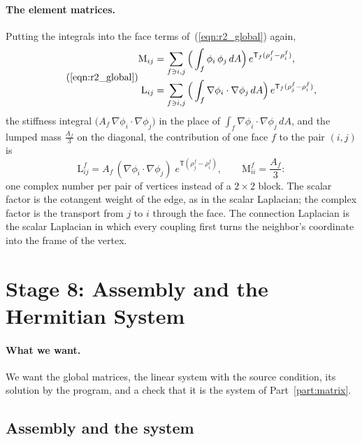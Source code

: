 \paragraph{The element matrices.} Putting the integrals into the face terms of~(\ref{eqn:r2_global}) again,
\begin{equation*}
\tag{\ref{eqn:r2_global}}
\begin{aligned}
\mathrm M_{ij} &= \sum_{f \ni i, j} \Big(\int_f \phi_i\,\phi_j\, dA\Big)\, e^{\mathsf T_f (\rho_j^f - \rho_i^f)}, \\
\mathrm L_{ij} &= \sum_{f \ni i, j} \Big(\int_f \nabla\phi_i\cdot\nabla\phi_j\, dA\Big)\, e^{\mathsf T_f (\rho_j^f - \rho_i^f)} ,
\end{aligned}
\end{equation*}
the stiffness integral $\big(A_f\,\nabla\phi_i\cdot\nabla\phi_j\big)$ in the place of $\int_f\nabla\phi_i\cdot\nabla\phi_j\, dA$, and the lumped mass $\frac{A_f}{3}$ on the diagonal, the contribution of one face $f$ to the pair $(i, j)$ is
\begin{equation}
\label{eqn:ga_element}
\mathrm L^f_{ij} = A_f\, (\nabla\phi_i \cdot \nabla\phi_j)\; e^{\mathsf T (\rho_j^f - \rho_i^f)}, \qquad \mathrm M^f_{ii} = \frac{A_f}{3} :
\end{equation}
one complex number per pair of vertices instead of a $2 \times 2$ block. The scalar factor is the cotangent weight of the edge, as in the scalar Laplacian; the complex factor is the transport from $j$ to $i$ through the face. The connection Laplacian is the scalar Laplacian in which every coupling first turns the neighbor's coordinate into the frame of the vertex.

\section{Stage 8: Assembly and the Hermitian System}
\label{section:r2_stage8}

\paragraph{What we want.} We want the global matrices, the linear system with the source condition, its solution by the program, and a check that it is the system of Part~\ref{part:matrix}.

\subsection{Assembly and the system}

